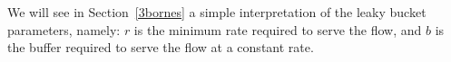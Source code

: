 %
%
%
%
%

We will see in Section~\ref{3bornes} a simple interpretation of
the leaky bucket parameters, namely: $r$ is the minimum rate
required to serve the flow, and $b$ is the buffer required to
serve the flow at a constant rate.

